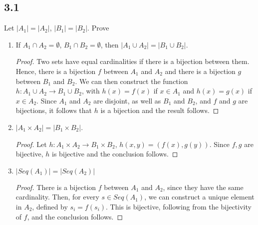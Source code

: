 \subsection*{3.1}
Let $|A_1| = |A_2|$, $|B_1| = |B_2|$. Prove

\begin{enumerate}
    \item If $A_1 \cap A_2 = \emptyset$, $B_1 \cap B_2 = \emptyset$, then $|A_1 \cup A_2| = |B_1 \cup B_2|$.
    
\begin{proof}
Two sets have equal cardinalities if there is a bijection between them. Hence, there is a bijection $f$ between $A_1$ and $A_2$ and there is a bijection $g$ between $B_1$ and $B_2$. We can then construct the function $h: A_1 \cup A_2 \rightarrow B_1 \cup B_2$, with $h(x) = f(x)$ if $x \in A_1$ and $h(x) = g(x)$ if $x \in A_2$. Since $A_1$ and $A_2$ are disjoint, as well as $B_1$ and $B_2$, and $f$ and $g$ are bijections, it follows that $h$ is a bijection and the result follows.

\end{proof}

\item $|A_1 \times A_2 | = |B_1 \times B_2|$. 

\begin{proof}
Let $h:A_1 \times A_2 \rightarrow B_1 \times B_2$, $h(x,y) = (f(x), g(y))$. Since $f,g$ are bijective, $h$ is bijective and the conclusion follows.
\end{proof}

\item $|Seq(A_1)| = |Seq(A_2)|$

\begin{proof}
There is a bijection $f$ between $A_1$ and $A_2$, since they have the same cardinality. Then, for every $s \in Seq(A_1)$, we can construct a unique element in $A_2$, defined by $s_i = f(s_i)$. This is bijective, following from the bijectivity of $f$, and the conclusion follows.
\end{proof}
    
\end{enumerate}



